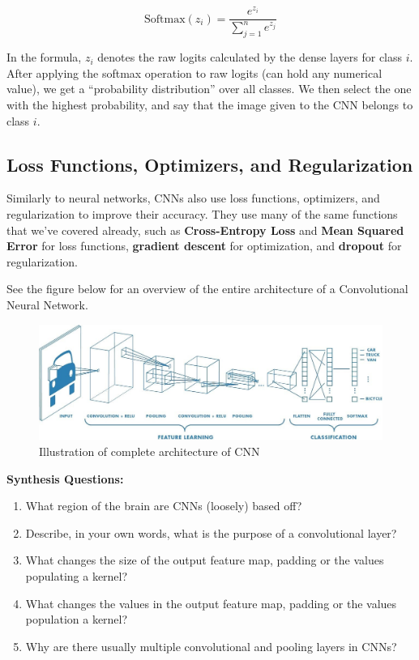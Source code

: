 \begin{flushleft}
        $$\mathrm{Softmax}(z_i) = \frac{e^{z_i}}{\sum^{n}_{j=1} e^{z_j}}$$
        
        In the formula, $z_i$ denotes the raw logits calculated by the dense layers for class $i$. After applying the softmax operation to raw logits (can hold any numerical value), we get a ``probability distribution'' over all classes. We then select the one with the highest probability, and say that the image given to the CNN belongs to class $i$.

        \subsection{Loss Functions, Optimizers, and Regularization}
        Similarly to neural networks, CNNs also use loss functions, optimizers, and regularization to improve their accuracy. They use many of the same functions that we've covered already, such as \textbf{Cross-Entropy Loss} and \textbf{Mean Squared Error} for loss functions, \textbf{gradient descent} for optimization, and \textbf{dropout} for regularization. \break

        See the figure below for an overview of the entire architecture of a Convolutional Neural Network.  \break
        
        \begin{figure}[H]
            \centering
            \includegraphics[width=1\linewidth]{cv/full_cnn.png}
            \caption{Illustration of complete architecture of CNN}
            \label{fig:full_cnn}
        \end{figure}
\end{flushleft}

\vspace{10px}
\begin{questionbox}
    \textbf{Synthesis Questions:}
    \begin{enumerate}    
        \item What region of the brain are CNNs (loosely) based off?
        \item Describe, in your own words, what is the purpose of a convolutional layer?
        \item What changes the size of the output feature map, padding or the values populating a kernel?
        \item What changes the values in the output feature map, padding or the values population a kernel?
        \item Why are there usually multiple convolutional and pooling layers in CNNs?
    \end{enumerate}
    \vspace{1px}
\end{questionbox}

